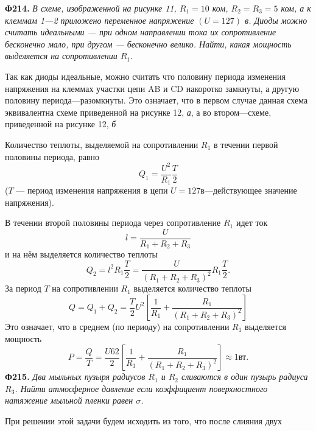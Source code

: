 \pagestyle{fancy}
\fancyhf{}
\renewcommand{\headrulewidth}{0pt}
\begin{multicols}{2}\fontsize{13}{12}
	\textbf{Ф214.} \textit{В схеме, изображенной на рисунке 11, \(R_1 = 10\) ком, \(R_2 = R_3 = 5\) ком, а к клеммам 1---2 приложено переменное напряжение \((U = 127)\) в.  Диоды можно считать  идеальными --- при одном направлении тока их сопротивление бесконечно мало, при другом --- бесконечно велико. Найти, какая мощность выделяется на сопротивлении \(R_1.\)}
	
	Так как диоды идеальные, можно считать что половину периода изменения напряжения на клеммах участки цепи AB и CD накоротко замкнуты, а другую половину периода---разомкнуты. Это означает, что в первом случае данная схема эквивалентна схеме приведенной на рисунке 12, \textit{а}, а во втором---схеме, приведенной на рисунке 12, \textit{б}
	
	Количество теплоты, выделяемой на сопротивлении \(R_1\) в течении первой половины периода, равно
	\[Q_1 = \frac{U^2}{R_1}\frac{T}{2}\]
	(\(T\) --- период изменения напряжения в цепи \(U = 127в\)---действующее значение напряжения).
	
	В течении второй половины периода через сопротивление \(R_1\) идет ток
	\[l=\frac{U}{R_1+R_2+R_3}\]
	и на нём выделяется количество теплоты
	\[Q_2 = l^2R_1\frac{T}{2}=\frac{U}{(R_1+R_2+R_3)^2}R_1\frac{T}{2}.\]
	За период \(T\) на сопротивлении \(R_1\) выделяется количество теплоты
	\[Q = Q_1+Q_2 = \frac{T}{2}U^2\left[\frac{1}{R_1}+\frac{R_1}{(R_1+R_2+R_3)^2}\right]\]
	Это означает, что в среднем (по периоду) на сопротивлении \(R_1\) выделяется мощность
	\[P = \frac{Q}{T} = \frac{U62}{2}\left[\frac{1}{R_1}+\frac{R_1}{(R_1+R_2+R_3)^2}\right]\approx 1 \textit{вт}.\]
	\textbf{Ф215.} \textit{Два мыльных пузыря радиусов \(R_1\) и \(R_2\) сливаются в один пузырь радиуса \(R_3\). Найти атмосферное давление если коэффициент поверхностного натяжение мыльной пленки равен \(\sigma\).}
	
	При решении этой задачи будем исходить из того, что после слияния двух
	\columnbreak
	
	\vspace{5px}
	

\end{multicols}
